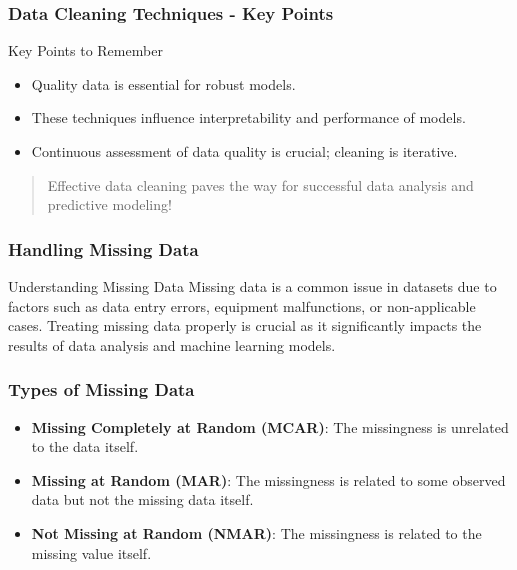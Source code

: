 \documentclass[aspectratio=169]{beamer}
\begin{document}
\begin{frame}[fragile]
    \frametitle{Data Cleaning Techniques - Key Points}
    \begin{block}{Key Points to Remember}
        \begin{itemize}
            \item Quality data is essential for robust models.
            \item These techniques influence interpretability and performance of models.
            \item Continuous assessment of data quality is crucial; cleaning is iterative.
        \end{itemize}
    \end{block}
    
    \begin{quote}
        Effective data cleaning paves the way for successful data analysis and predictive modeling!
    \end{quote}
\end{frame}

\begin{frame}[fragile]
    \frametitle{Handling Missing Data}
    \begin{block}{Understanding Missing Data}
        Missing data is a common issue in datasets due to factors such as data entry errors, equipment malfunctions, or non-applicable cases. 
        Treating missing data properly is crucial as it significantly impacts the results of data analysis and machine learning models.
    \end{block}
\end{frame}

\begin{frame}[fragile]
    \frametitle{Types of Missing Data}
    \begin{itemize}
        \item \textbf{Missing Completely at Random (MCAR)}: 
        The missingness is unrelated to the data itself.
        \item \textbf{Missing at Random (MAR)}: 
        The missingness is related to some observed data but not the missing data itself.
        \item \textbf{Not Missing at Random (NMAR)}: 
        The missingness is related to the missing value itself.
    \end{itemize}
\end{frame}
\end{document}

